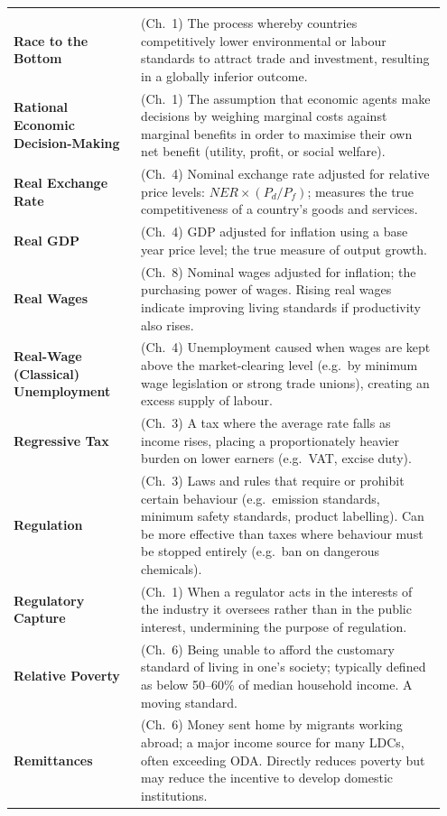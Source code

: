\documentclass[11pt, a4paper, twoside]{book}
\begin{document}
\begin{longtable}{@{}>{\RaggedRight\arraybackslash}p{0.28\linewidth}>{\RaggedRight\arraybackslash}p{0.67\linewidth}@{}}
\multicolumn{2}{@{}l}{\textbf{\Large\color{CurveNavy} R}} \\[2pt]
\textbf{Race to the Bottom} & (Ch.~1) The process whereby countries competitively lower environmental or labour standards to attract trade and investment, resulting in a globally inferior outcome. \\
\textbf{Rational Economic Decision-Making} & (Ch.~1) The assumption that economic agents make decisions by weighing marginal costs against marginal benefits in order to maximise their own net benefit (utility, profit, or social welfare). \\
\textbf{Real Exchange Rate} & (Ch.~4) Nominal exchange rate adjusted for relative price levels: $NER \times (P_d / P_f)$; measures the true competitiveness of a country's goods and services. \\
\textbf{Real GDP} & (Ch.~4) GDP adjusted for inflation using a base year price level; the true measure of output growth. \\
\textbf{Real Wages} & (Ch.~8) Nominal wages adjusted for inflation; the purchasing power of wages. Rising real wages indicate improving living standards if productivity also rises. \\
\textbf{Real-Wage (Classical) Unemployment} & (Ch.~4) Unemployment caused when wages are kept above the market-clearing level (e.g.\ by minimum wage legislation or strong trade unions), creating an excess supply of labour. \\
\textbf{Regressive Tax} & (Ch.~3) A tax where the average rate falls as income rises, placing a proportionately heavier burden on lower earners (e.g.\ VAT, excise duty). \\
\textbf{Regulation} & (Ch.~3) Laws and rules that require or prohibit certain behaviour (e.g.\ emission standards, minimum safety standards, product labelling). Can be more effective than taxes where behaviour must be stopped entirely (e.g.\ ban on dangerous chemicals). \\
\textbf{Regulatory Capture} & (Ch.~1) When a regulator acts in the interests of the industry it oversees rather than in the public interest, undermining the purpose of regulation. \\
\textbf{Relative Poverty} & (Ch.~6) Being unable to afford the customary standard of living in one's society; typically defined as below 50--60\% of median household income. A moving standard. \\
\textbf{Remittances} & (Ch.~6) Money sent home by migrants working abroad; a major income source for many LDCs, often exceeding ODA. Directly reduces poverty but may reduce the incentive to develop domestic institutions. \\

\end{longtable}
\end{document}

